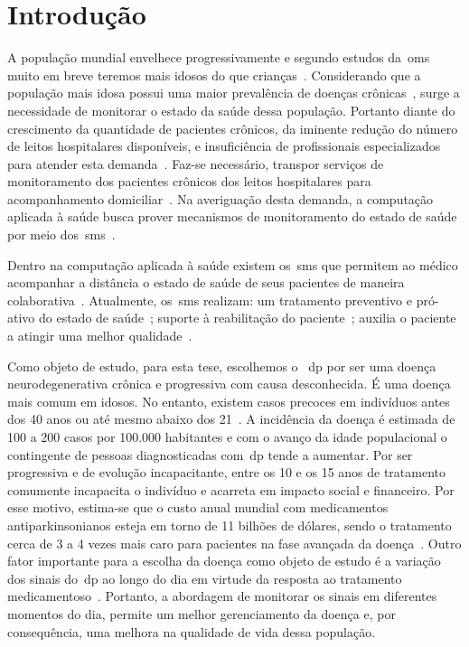 \chapter{Introdu\c{c}\~{a}o} \label{chapter:intro}

A população mundial envelhece progressivamente e segundo estudos da~\ac{oms} muito em breve teremos mais idosos do que crianças~\cite{ageing2011}. Considerando que a população mais idosa possui uma maior prevalência de doenças crônicas~\cite{prevcronica2009}, surge a necessidade de monitorar o estado da saúde dessa população. Portanto diante do crescimento da quantidade de pacientes crônicos, da iminente redução do número de leitos hospitalares disponíveis, e insuficiência de profissionais especializados para atender esta demanda~\cite{healthmonitoring2013}. Faz-se necessário, transpor serviços de monitoramento dos pacientes crônicos dos leitos hospitalares para acompanhamento domiciliar~\cite{homecarebrazil2011}. Na averiguação desta demanda, a computação aplicada à saúde busca prover mecanismos de monitoramento do estado de saúde por meio dos~\ac{sms}~\cite{healthmonitoring2013,berg03,bardram2010,Ballegaard:2008:HEL:1357054.1357336,aarhus_negotiating_2010}. 


Dentro na computação aplicada à saúde existem os~\ac{sms} que permitem ao médico acompanhar a distância o estado de saúde de seus pacientes de maneira colaborativa~\cite{healthmonitoring2013}. Atualmente, os~\ac{sms} realizam: um tratamento preventivo e pró-ativo do estado de saúde~\cite{bardram2010}; suporte à reabilitação do paciente~\cite{sacbespoke2014}; auxilia o paciente a atingir uma melhor qualidade~\cite{sacsvmhms2014}. 

Como objeto de estudo, para esta tese, escolhemos o ~\ac{dp} por ser uma doença neurodegenerativa crônica e progressiva com causa desconhecida. É  uma doença mais comum em idosos. No entanto, existem casos precoces em indivíduos antes dos 40 anos ou até mesmo abaixo dos 21~\cite{menezes2003}. A incidência da doença é estimada de 100 a 200 casos por 100.000 habitantes e com o avanço da idade populacional o contingente de pessoas diagnosticadas com~\ac{dp} tende a aumentar. Por ser progressiva e de evolução incapacitante, entre os 10 e os 15 anos de tratamento comumente incapacita o indivíduo e acarreta em impacto social e financeiro. Por esse motivo, estima-se que o custo anual mundial com medicamentos antiparkinsonianos esteja em torno de 11 bilhões de dólares, sendo o tratamento cerca de 3 a 4 vezes mais caro para pacientes na fase avançada da doença~\cite{protpar010}. Outro fator importante para a escolha da doença como objeto de estudo é a variação dos sinais do~\ac{dp} ao longo do dia em virtude da resposta ao tratamento medicamentoso~\cite{protpar010}. Portanto, a abordagem de monitorar os sinais em diferentes momentos do dia, permite um melhor gerenciamento da doença e, por consequência, uma melhora na qualidade de vida dessa população.





